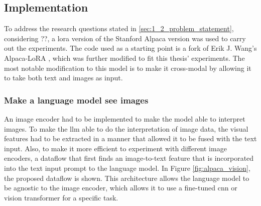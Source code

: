        \subsection{Implementation}
        To address the research questions stated in \ref{sec:1_2_problem_statement}, considering ??, a \gls{lora} version of the Stanford Alpaca version was used to carry out the experiments. The code used as a starting point is a fork of Erik J. Wang's Alpaca-LoRA \cite{wangAlpacaLoRA2023}, which was further modified to fit this thesis' experiments. The most notable modification to this model is to make it cross-modal by allowing it to take both text and images as input.

        \subsubsection{Make a language model see images}
        An image encoder had to be implemented to make the model able to interpret images. To make the \gls{llm} able to do the interpretation of image data, the visual features had to be extracted in a manner that allowed it to be fused with the text input. Also, to make it more efficient to experiment with different image encoders, a dataflow that first finds an image-to-text feature that is incorporated into the text input prompt to the language model. In Figure \ref{fig:alpaca_vision}, the proposed dataflow is shown. This architecture allows the language model to be agnostic to the image encoder, which allows it to use a fine-tuned \gls{cnn} or vision transformer for a specific task. 

